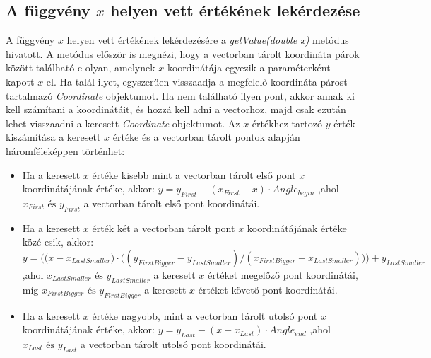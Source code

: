 \documentclass [12pt]{report}
\begin{document}
\subsection{A függvény $x$ helyen vett értékének lekérdezése} \label{getValue}
A függvény $x$ helyen vett értékének lekérdezésére a \textit{getValue(double x)} metódus hivatott. A metódus először is megnézi, hogy a vectorban tárolt koordináta párok között található-e olyan, amelynek $x$ koordinátája egyezik a paraméterként kapott $x$-el. Ha talál ilyet, egyszerűen visszaadja a megfelelő koordináta párost tartalmazó \textit{Coordinate} objektumot. Ha nem található ilyen pont, akkor annak ki kell számítani a koordinátáit, és hozzá kell adni a vectorhoz, majd csak ezután lehet visszaadni a keresett \textit{Coordinate} objektumot. Az $x$ értékhez tartozó $y$ érték kiszámítása a keresett $x$ értéke és a vectorban tárolt pontok alapján háromféleképpen történhet:
\begin{itemize}
\item Ha a keresett $x$ értéke kisebb mint a vectorban tárolt első pont $x$ koordinátájának értéke, akkor: 
$y=y_{First}-(x_{First}-x) \cdot Angle_{begin}$ ,ahol $x_{First} \text{ és } y_{First}$ a vectorban tárolt első pont koordinátái.
\item Ha a keresett $x$ érték két a vectorban tárolt pont $x$ koordinátájának értéke közé esik, akkor:
$y=\bigg(\big(x-x_{LastSmaller}\big) \cdot \big((y_{FirstBigger}-y_{LastSmaller})/(x_{FirstBigger}-x_{LastSmaller})\big)\bigg)+y_{LastSmaller}$ ,ahol $x_{LastSmaller} \text{ és } y_{LastSmaller}$ a keresett $x$ értéket megelőző pont koordinátái, míg $x_{FirstBigger} \text{ és } y_{FirstBigger}$ a keresett $x$ értéket követő pont koordinátái. 
\item Ha a keresett $x$ értéke nagyobb, mint a vectorban tárolt utolsó pont $x$ koordinátájának értéke, akkor:
$y=y_{Last}-(x-x_{Last}) \cdot Angle_{end}$ ,ahol $x_{Last} \text{ és } y_{Last}$ a vectorban tárolt utolsó pont koordinátái.
\end{itemize}
\end{document}
